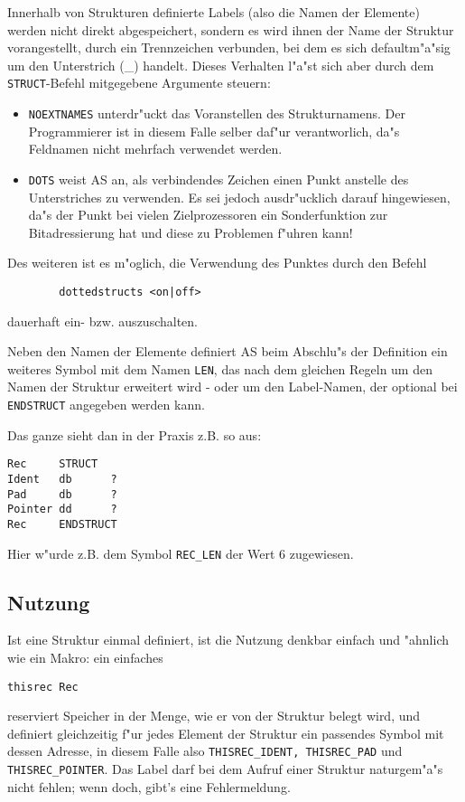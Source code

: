 \documentclass[12pt,a4paper,twoside]{report}
\newcommand{\tty}[1]{{\tt #1}}
\begin{document}
Innerhalb von Strukturen definierte Labels (also die Namen der Elemente)
werden nicht direkt abgespeichert, sondern es wird ihnen der Name der
Struktur vorangestellt, durch ein Trennzeichen verbunden, bei dem es sich
defaultm"a"sig um den Unterstrich (\_) handelt.  Dieses Verhalten l"a"st
sich aber durch dem \tty{STRUCT}-Befehl mitgegebene Argumente steuern:
\begin{itemize}
\item{\tty{NOEXTNAMES} unterdr"uckt das Voranstellen des Strukturnamens.
      Der Programmierer ist in diesem Falle selber daf"ur verantworlich,
      da"s Feldnamen nicht mehrfach verwendet werden.}
\item{\tty{DOTS} weist AS an, als verbindendes Zeichen einen Punkt
      anstelle des Unterstriches zu verwenden.  Es sei jedoch
      ausdr"ucklich darauf hingewiesen, da"s der Punkt bei vielen
      Zielprozessoren ein Sonderfunktion zur Bitadressierung hat und
      diese zu Problemen f"uhren kann!}
\end{itemize}
Des weiteren ist es m"oglich, die Verwendung des Punktes durch den Befehl
\begin{verbatim}
        dottedstructs <on|off>
\end{verbatim}
dauerhaft ein- bzw. auszuschalten.

Neben den Namen der Elemente definiert AS beim Abschlu"s der Definition
ein weiteres Symbol mit dem Namen {\tt LEN}, das nach dem gleichen Regeln
um den Namen der Struktur erweitert wird - oder um den Label-Namen, der
optional bei \tty{ENDSTRUCT} angegeben werden kann.

Das ganze sieht dan in der Praxis z.B. so aus:
\begin{verbatim}
Rec     STRUCT
Ident   db      ?
Pad     db      ?
Pointer dd      ?
Rec     ENDSTRUCT
\end{verbatim}
Hier w"urde z.B. dem Symbol {\tt REC\_LEN} der Wert 6 zugewiesen.

\subsection{Nutzung}

Ist eine Struktur einmal definiert, ist die Nutzung denkbar einfach und
"ahnlich wie ein Makro: ein einfaches
\begin{verbatim}
thisrec Rec
\end{verbatim}
reserviert Speicher in der Menge, wie er von der Struktur belegt wird, und
definiert gleichzeitig f"ur jedes Element der Struktur ein passendes
Symbol mit dessen Adresse, in diesem Falle also {\tt THISREC\_IDENT,
THISREC\_PAD} und {\tt THISREC\_POINTER}.  Das Label darf bei dem Aufruf
einer Struktur naturgem"a"s nicht fehlen; wenn doch, gibt's eine
Fehlermeldung.
\end{document}

